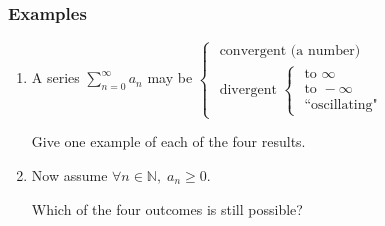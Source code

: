 \documentclass[14pt]{beamer}
\begin{document}




	\begin{frame}[t]
		\frametitle{Examples}

		\begin{enumerate}
			\item A series $\displaystyle \sum_{n=0}^{\infty}a_{n}$ may be $\displaystyle
				\begin{cases}
					\text{ convergent (a number) }                                                                                  \\
					\text{ divergent } \begin{cases}\text{ to } \infty \\ \text{ to } - \infty \\ \text{ ``oscillating"}\end{cases}
				\end{cases}$
				\vspace{.5cm}

				Give one example of each of the four results.
				\vspace{.5cm}

			\item Now assume $\displaystyle \forall n \in \mathbb{N}, \; a_{n}\geq 0$.

				Which of the four outcomes is still possible?
		\end{enumerate}
	\end{frame}
\end{document}

